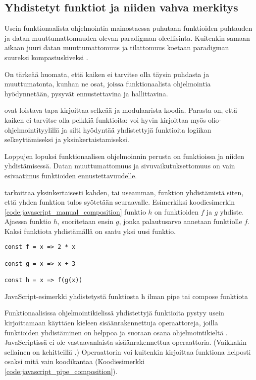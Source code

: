 \subsection{Yhdistetyt funktiot ja niiden vahva merkitys}

Usein funktionaalista ohjelmointia mainostaessa puhutaan funktioiden puhtauden ja datan muuttumattomuuden olevan paradigman oleellisinta. Kuitenkin samaan aikaan juuri datan muuttumattomuus ja tilattomuus koetaan paradigman suureksi kompastuskiveksi \cite{cantarella_fp_haitat,is_reduce_bad,vakil2016}.

On tärkeää huomata, että kaiken ei tarvitse olla täysin puhdasta ja muuttumatonta, kunhan ne osat, joissa funktionaalista ohjelmointia hyödynnetään, pysyvät ennustettavina ja hallittavina.

 ovat loistava tapa kirjoittaa selkeää ja modulaarista koodia. Parasta on, että kaiken ei tarvitse olla pelkkiä funktioita: voi hyvin kirjoittaa myös olio-ohjelmointityylillä ja silti hyödyntää yhdistettyjä funktioita logiikan selkeyttämiseksi ja yksinkertaistamiseksi.

Loppujen lopuksi funktionaalisen ohjelmoinnin perusta on funktioissa ja niiden yhdistämisessä. Datan muuttumattomuus ja sivuvaikutuksettomuus on vain esivaatimus funktioiden ennustettavuudelle.

 tarkoittaa yksinkertaisesti kahden, tai useamman, funktion yhdistämistä siten, että yhden funktion tulos syötetään seuraavalle. Esimerkiksi koodiesimerkin \ref{code:javascript_manual_composition} funktio $h$ on funktioiden $f$ ja $g$ yhdiste. Ajaessa funktio $h$, suoritetaan ensin $g$, jonka palautusarvo annetaan funktiolle $f$. Kaksi funktiota yhdistämällä on saatu yksi uusi funktio.

\begin{code}
    \begin{verbatim}
const f = x => 2 * x

const g = x => x + 3

const h = x => f(g(x))
\end{verbatim}
    \caption{JavaScript-esimerkki yhdistetystä funktiosta h ilman pipe tai compose funktiota}
    \label{code:javascript_manual_composition}
\end{code}

Funktionaalisissa ohjelmointikielissä yhdistettyjä funktioita pystyy usein kirjoittamaan käyttäen kieleen sisäänrakennettuja operaattoreja, joilla funktioiden yhdistäminen on helppoa ja suoraan osana ohjelmointikieltä \cite{fsharpcomposition,haskellcomposition}.
JavaScriptissä ei ole vastaavanlaista sisäänrakennettua operaattoria.
(Vaikkakin sellainen on kehitteillä \cite{tc39_pipeline_operator}.)
Operaattorin voi kuitenkin kirjoittaa funktiona helposti osaksi mitä vain koodikantaa (Koodiesimerkki \ref{code:javascript_pipe_composition}).

